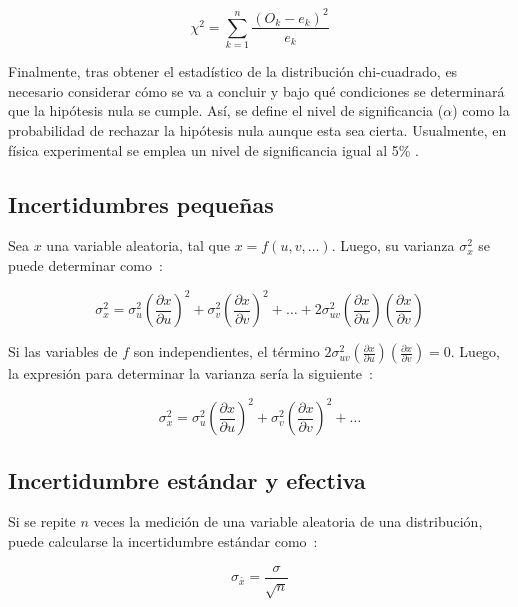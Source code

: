 \documentclass[twocolumn]{article} %
\begin{document}
\begin{equation}
\chi^2 = \sum_{k=1}^{n} \frac{(O_k - e_k)^2}{e_k} 
\label{chi}
\end{equation}

Finalmente, tras obtener el estadístico de la distribución chi-cuadrado, es necesario considerar cómo se va a concluir y bajo qué condiciones se determinará que la hipótesis nula se cumple. Así, se define el nivel de significancia ($\alpha$) como la probabilidad de rechazar la hipótesis nula aunque esta sea cierta. Usualmente, en física experimental se emplea un nivel de significancia igual al 5\% \cite{marques1991probabilidad}.

\subsection{Incertidumbres pequeñas} \label{Inceridumbres pequeñas}
Sea $x$ una variable aleatoria, tal que $x=f(u,v,\dots)$. Luego, su varianza $\sigma_x^2$ se puede determinar como~\cite{bevington2003data}:

\begin{equation}
    \sigma_x^2=\sigma_u^2\left(\frac{\partial x}{\partial u}\right)^2 + \sigma_v^2\left(\frac{\partial x}{\partial v}\right)^2 + \dots + 2\sigma_{uv}^2\left(\frac{\partial x}{\partial u}\right)\left(\frac{\partial x}{\partial v}\right)
\end{equation}

Si las variables de $f$ son independientes, el término $2\sigma_{uv}^2\left(\frac{\partial x}{\partial u}\right)\left(\frac{\partial x}{\partial v}\right)=0$. Luego, la expresión para determinar la varianza sería la siguiente~\cite{bevington2003data}:

\begin{equation}
    \sigma_x^2=\sigma_u^2\left(\frac{\partial x}{\partial u}\right)^2 + \sigma_v^2\left(\frac{\partial x}{\partial v}\right)^2 + \dots
\end{equation}
\subsection{Incertidumbre estándar y efectiva}
Si se repite $n$ veces la medición de una variable aleatoria de una distribución, puede calcularse la incertidumbre estándar como~\cite{marques1991probabilidad}:

\begin{equation}
    \sigma_{\bar{x}} = \frac{\sigma}{\sqrt{n}}
\end{equation}
\end{document}
